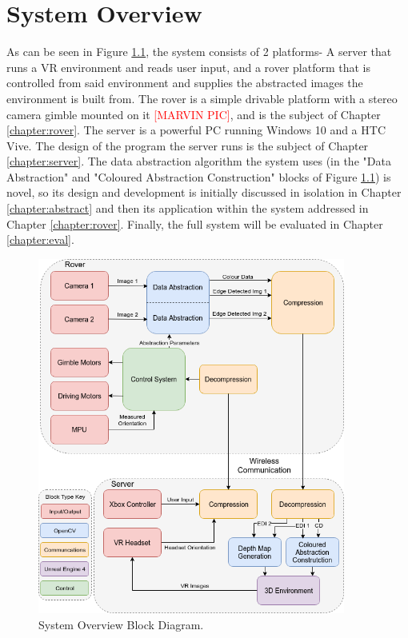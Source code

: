\chapter{System Overview}
\label{chapter:system}

As can be seen in Figure \ref{fig:system}, the system consists of 2 platforms- A server that runs a VR environment and reads user input, and a rover platform that is controlled from said environment and supplies the abstracted images the environment is built from. The rover is a simple drivable platform with a stereo camera gimble mounted on it \textcolor{red}{[MARVIN PIC]}, and is the subject of Chapter \ref{chapter:rover}. The server is a powerful PC running Windows 10 and a HTC Vive. The design of the program the server runs is the subject of Chapter \ref{chapter:server}. The data abstraction algorithm the system uses (in the "Data Abstraction" and "Coloured Abstraction Construction" blocks of Figure \ref{fig:system}) is novel, so its design and development is initially discussed in isolation in Chapter \ref{chapter:abstract} and then its application within the system addressed in Chapter \ref{chapter:rover}. Finally, the full system will be evaluated in Chapter \ref{chapter:eval}.

\begin{figure}[H]
    \begin{center}
      \includegraphics[width=0.9\textwidth]{Figures/System.png}
      \caption[System Overview Block Diagram]{System Overview Block Diagram.}
      \label{fig:system}
    \end{center}
\end{figure}